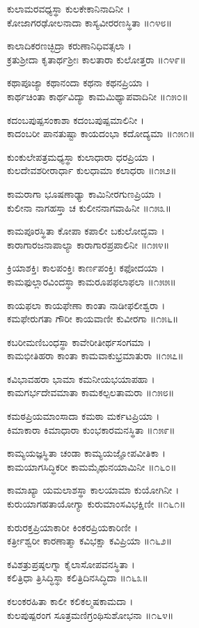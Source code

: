 ಕುಲಾಮರವಧ್ಯಸ್ಥಾ ಕುಲಕೇಕಾನಿನಾದಿನೀ ।\\
ಕೋಜಾಗರಢೋಲನಾದಾ ಕಾಸ್ಯವೀರರಣಸ್ಥಿತಾ ॥೧೪೮॥

ಕಾಲಾದಿಕರಣಚ್ಛಿದ್ರಾ ಕರುಣಾನಿಧಿವತ್ಸಲಾ ।\\
ಕ್ರತುಶ್ರೀದಾ ಕೃತಾರ್ಥಶ್ರೀಃ ಕಾಲತಾರಾ ಕುಲೋತ್ತರಾ ॥೧೪೯॥

ಕಥಾಪೂಜ್ಯಾ ಕಥಾನಂದಾ ಕಥನಾ ಕಥನಪ್ರಿಯಾ ।\\
ಕಾರ್ಥಚಿಂತಾ ಕಾರ್ಥವಿದ್ಯಾ ಕಾಮಮಿಥ್ಯಾಪವಾದಿನೀ ॥೧೫೦॥

ಕದಂಬಪುಷ್ಪಸಂಕಾಶಾ ಕದಂಬಪುಷ್ಪಮಾಲಿನೀ ।\\
ಕಾದಂಬರೀ ಪಾನತುಷ್ಟಾ ಕಾಯದಂಭಾ ಕದೋದ್ಯಮಾ ॥೧೫೧॥

ಕುಂಕುಲೇಪತ್ರಮಧ್ಯಸ್ಥಾ ಕುಲಾಧಾರಾ ಧರಪ್ರಿಯಾ ।\\
ಕುಲದೇವಶರೀರಾರ್ಧಾ ಕುಲಧಾಮಾ ಕಲಾಧರಾ ॥೧೫೨॥

ಕಾಮರಾಗಾ ಭೂಷಣಾಢ್ಯಾ ಕಾಮಿನೀರಗುಣಪ್ರಿಯಾ ।\\
ಕುಲೀನಾ ನಾಗಹಸ್ತಾ ಚ ಕುಲೀನನಾಗವಾಹಿನೀ ॥೧೫೩॥

ಕಾಮಪೂರಸ್ಥಿತಾ ಕೋಪಾ ಕಪಾಲೀ ಬಕುಲೋದ್ಭವಾ ।\\
ಕಾರಾಗಾರಜನಾಪಾಲ್ಯಾ ಕಾರಾಗಾರಪ್ರಪಾಲಿನೀ ॥೧೫೪॥

ಕ್ರಿಯಾಶಕ್ತಿಃ ಕಾಲಪಂಕ್ತಿಃ ಕಾರ್ಣಪಂಕ್ತಿಃ ಕಫೋದಯಾ ।\\
ಕಾಮಫುಲ್ಲಾರವಿಂದಸ್ಥಾ ಕಾಮರೂಪಫಲಾಫಲಾ ॥೧೫೫॥

ಕಾಯಫಲಾ ಕಾಯಫೇಣಾ ಕಾಂತಾ ನಾಡೀಫಲೀಶ್ವರಾ ।\\
ಕಮಫೇರುಗತಾ ಗೌರೀ ಕಾಯವಾಣೀ ಕುವೀರಗಾ ॥೧೫೬॥

ಕಬರೀಮಣಿಬಂಧಸ್ಥಾ ಕಾವೇರೀತೀರ್ಥಸಂಗಮಾ ।\\
ಕಾಮಭೀತಿಹರಾ ಕಾಂತಾ ಕಾಮವಾಕುಭ್ರಮಾತುರಾ ॥೧೫೭॥

ಕವಿಭಾವಹರಾ ಭಾಮಾ ಕಮನೀಯಭಯಾಪಹಾ ।\\
ಕಾಮಗರ್ಭದೇವಮಾತಾ ಕಾಮಕಲ್ಪಲತಾಮರಾ ॥೧೫೮॥

ಕಮಠಪ್ರಿಯಮಾಂಸಾದಾ ಕಮಠಾ ಮರ್ಕಟಪ್ರಿಯಾ ।\\
ಕಿಮಾಕಾರಾ ಕಿಮಾಧಾರಾ ಕುಂಭಕಾರಮನಸ್ಥಿತಾ ॥೧೫೯॥

ಕಾಮ್ಯಯಜ್ಞಸ್ಥಿತಾ ಚಂಡಾ ಕಾಮ್ಯಯಜ್ಞೋಪವೀತಿಕಾ ।\\
ಕಾಮಯಾಗಸಿದ್ಧಿಕರೀ ಕಾಮಮೈಥುನಯಾಮಿನೀ ॥೧೬೦॥

ಕಾಮಾಖ್ಯಾ ಯಮಲಾಶಸ್ಥಾ ಕಾಲಯಾಮಾ ಕುಯೋಗಿನೀ ।\\
ಕುರುಯಾಗಹತಾಯೋಗ್ಯಾ ಕುರುಮಾಂಸವಿಭಕ್ಷಿಣೀ ॥೧೬೧॥

ಕುರುರಕ್ತಪ್ರಿಯಾಕಾರೀ ಕಿಂಕರಪ್ರಿಯಕಾರಿಣೀ ।\\
ಕರ್ತ್ರೀಶ್ವರೀ ಕಾರಣಾತ್ಮಾ ಕವಿಭಕ್ಷಾ ಕವಿಪ್ರಿಯಾ ॥೧೬೨॥

ಕವಿಶತ್ರುಪ್ರಷ್ಠಲಗ್ನಾ ಕೈಲಾಸೋಪವನಸ್ಥಿತಾ ।\\
ಕಲಿತ್ರಿಧಾ ತ್ರಿಸಿದ್ಧಿಸ್ಥಾ ಕಲಿತ್ರಿದಿನಸಿದ್ಧಿದಾ ॥೧೬೩॥

ಕಲಂಕರಹಿತಾ ಕಾಲೀ ಕಲಿಕಲ್ಮಷಕಾಮದಾ ।\\
ಕುಲಪುಷ್ಪರಂಗ ಸೂತ್ರಮಣಿಗ್ರಂಥಿಸುಶೋಭನಾ ॥೧೬೪॥

